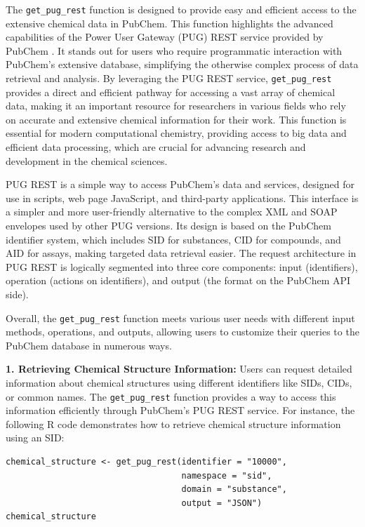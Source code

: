 The \texttt{get\_pug\_rest} function is designed to provide easy and efficient access to the extensive chemical data in PubChem. This function highlights the advanced capabilities of the Power User Gateway (PUG) REST service provided by PubChem \citep{kim2015pug, kim2018update}. It stands out for users who require programmatic interaction with PubChem's extensive database, simplifying the otherwise complex process of data retrieval and analysis. By leveraging the PUG REST service, \texttt{get\_pug\_rest} provides a direct and efficient pathway for accessing a vast array of chemical data, making it an important resource for researchers in various fields who rely on accurate and extensive chemical information for their work. This function is essential for modern computational chemistry, providing access to big data and efficient data processing, which are crucial for advancing research and development in the chemical sciences.

PUG REST is a simple way to access PubChem's data and services, designed for use in scripts, web page JavaScript, and third-party applications. This interface is a simpler and more user-friendly alternative to the complex XML and SOAP envelopes used by other PUG versions. Its design is based on the PubChem identifier system, which includes SID for substances, CID for compounds, and AID for assays, making targeted data retrieval easier. The request architecture in PUG REST is logically segmented into three core components: input (identifiers), operation (actions on identifiers), and output (the format on the PubChem API side).

Overall, the \texttt{get\_pug\_rest} function meets various user needs with different input methods, operations, and outputs, allowing users to customize their queries to the PubChem database in numerous ways.

\textbf{1. Retrieving Chemical Structure Information:} Users can request detailed information about chemical structures using different identifiers like SIDs, CIDs, or common names. The \texttt{get\_pug\_rest} function provides a way to access this information efficiently through PubChem's PUG REST service. For instance, the following R code demonstrates how to retrieve chemical structure information using an SID:

\begin{verbatim}
chemical_structure <- get_pug_rest(identifier = "10000", 
                                   namespace = "sid", 
                                   domain = "substance", 
                                   output = "JSON")
chemical_structure
\end{verbatim}

